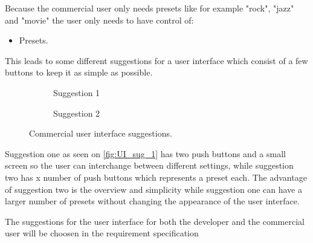 Because the commercial user only needs presets like for example "rock", "jazz" and "movie" the user only needs to have control of: 
\begin{itemize}
\item Presets.
\end{itemize} 
This leads to some different suggestions for a user interface which consist of a few buttons to keep it as simple as possible.


\begin{figure}[H]
\centering
\begin{subfigure}[t]{0.47\textwidth}
	\centering
	
	\caption{Suggestion 1}
	\label{fig:UI_sug_1}
\end{subfigure}
\hspace{6mm} 
\begin{subfigure}[t]{0.47\textwidth}
	\centering
	
	\caption{Suggestion 2}
	\label{fig:UI_sug_2}
\end{subfigure}
\caption{Commercial user interface suggestions.}
\label{fig:UI_sug}
\end{figure}

Suggestion one as seen on \autoref{fig:UI_sug_1} has two push buttons and a small screen so the user can interchange between different settings, while suggestion two has x number of push buttons which represents a preset each. The advantage of suggestion two is the overview and simplicity while suggestion one can have a larger number of presets without changing the appearance of the user interface. 

The suggestions for the user interface for both the developer and the commercial user will be choosen in the requirement specification   

